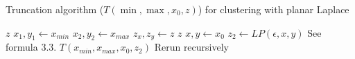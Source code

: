 \begin{algorithm}[H]
  \caption{Truncation algorithm ($T(\min, \max, x_0, z)$) for clustering with planar Laplace}\label{alg:truncaction-rq1}
  \begin{algorithmic}
    \Ensure $z$
    \State $x_1, y_1 \gets x_{min}$
    \State $x_2, y_2 \gets x_{max}$
    \State $z_x, z_y \gets z$
    \State \Return $z$
    \Else
    \State $x, y \gets x_0$
    \State $z_2 \gets LP(\epsilon, x, y)$ \Comment See formula 3.3.
    \State \Return $T(x_{min}, x_{max}, x_0, z_2)$ \Comment Rerun recursively
    \EndIf
  \end{algorithmic}
\end{algorithm}